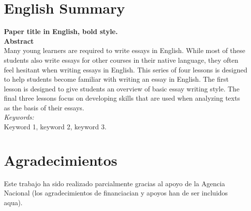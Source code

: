 \documentclass[5p,times,authoryear]{elsarticle}
\begin{document}
\section*{English Summary}

\textbf{Paper title in English, bold style.}\\

\noindent \textbf{Abstract}\\

Many young learners are required to write essays in English. While most of these students also write essays for other courses in their native language, they often feel hesitant when writing essays in English. This series of four lessons is designed to help students become familiar with writing an essay in English. The first lesson is designed to give students an overview of basic essay writing style. The final three lessons focus on developing skills that are used when analyzing texts as the basis of their essays.\\

\noindent \emph{Keywords:}\\

Keyword 1, keyword 2, keyword 3.
\section*{Agradecimientos}

Este trabajo ha sido realizado parcialmente gracias al apoyo de la Agencia Nacional (los agradecimientos de financiacian y apoyos han de ser incluidos aqua).

\label{}








\end{document}
